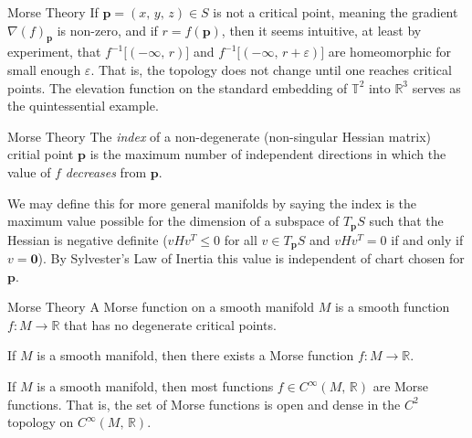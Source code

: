 \documentclass{beamer}
\begin{document}
    \begin{frame}{Morse Theory}
        If $\mathbf{p}=(x,\,y,\,z)\in{S}$ is not a critical point, meaning the
        gradient $\nabla(f)_{\mathbf{p}}$ is non-zero, and if $r=f(\mathbf{p})$,
        then it seems intuitive, at least by experiment, that
        $f^{-1}\big[(-\infty,\,r)\big]$ and
        $f^{-1}\big[(-\infty,\,r+\varepsilon)\big]$ are homeomorphic for small
        enough $\varepsilon$. That is, the topology does not change until one
        reaches critical points. The elevation function on the standard
        embedding of $\mathbb{T}^{2}$ into $\mathbb{R}^{3}$ serves as the
        quintessential example.
    \end{frame}
    \begin{frame}{Morse Theory}
        The \textit{index} of a non-degenerate (non-singular Hessian matrix)
        critial point $\mathbf{p}$ is the maximum number of independent
        directions in which the value of $f$ \textit{decreases}
        from $\mathbf{p}$.
        \par\hfill\par
        We may define this for more general manifolds by saying the index is
        the maximum value possible for the dimension of a subspace of
        $T_{\mathbf{p}}S$ such that the Hessian is negative definite
        ($vHv^{T}\leq{0}$ for all $v\in{T}_{\mathbf{p}}S$ and
        $vHv^{T}=0$ if and only if $v=\mathbf{0}$). By Sylvester's Law of
        Inertia this value is independent of chart chosen for $\mathbf{p}$.
    \end{frame}
    \begin{frame}{Morse Theory}
        A Morse function on a smooth manifold $M$ is a smooth function
        $f:M\rightarrow\mathbb{R}$ that has no degenerate critical points.
        \begin{theorem}
            If $M$ is a smooth manifold, then there exists a Morse function
            $f:M\rightarrow\mathbb{R}$.
        \end{theorem}
        \begin{theorem}
            If $M$ is a smooth manifold, then most functions
            $f\in{C}^{\infty}(M,\,\mathbb{R})$ are Morse functions.
            That is, the set of Morse functions is open and dense in the
            $C^{2}$ topology on $C^{\infty}(M,\,\mathbb{R})$.
        \end{theorem}
    \end{frame}
\end{document}
